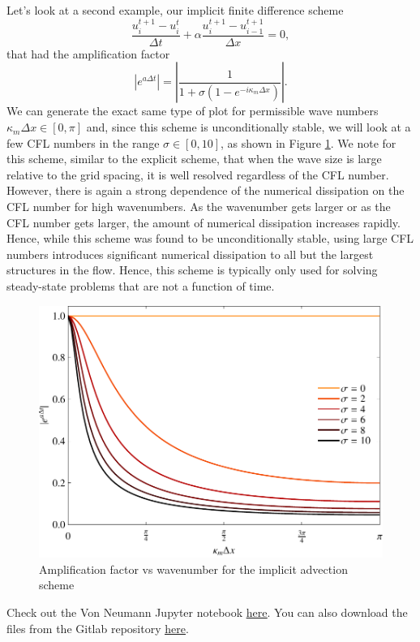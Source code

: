 Let's look at a second example, our implicit finite difference scheme
\begin{equation}
	\frac{u_i^{t+1} - u_{i}^t}{\Delta t} +  \alpha \frac{u_i^{t+1} - u_{i-1}^{t+1}}{\Delta x} = 0,
\end{equation}
that had the amplification factor
\begin{equation}
	|e^{a\Delta t}| = \left| \frac{1}{1 + \sigma \left( 1 - e^{-i \kappa_m \Delta x} \right)} \right|.
\end{equation}
We can generate the exact same type of plot for permissible wave numbers $\kappa_m \Delta x \in [0,\pi]$ and, since this scheme is unconditionally stable, we will look at a few CFL numbers in the range $\sigma \in [0,10]$, as shown in Figure \ref{fig:dissipation_advection_implicit}. We note for this scheme, similar to the explicit scheme, that when the wave size is large relative to the grid spacing, it is well resolved regardless of the CFL number. However, there is again a strong dependence of the numerical dissipation on the CFL number for high wavenumbers. As the wavenumber gets larger or as the CFL number gets larger, the amount of numerical dissipation increases rapidly. Hence, while this scheme was found to be unconditionally stable, using large CFL numbers introduces significant numerical dissipation to all but the largest structures in the flow. Hence, this scheme is typically only used for solving steady-state problems that are not a function of time.
\begin{figure}[htbp]
	\centering
	\includegraphics[width=0.6\linewidth]{Pictures/dissipation_adv_implct}
	\caption{Amplification factor vs wavenumber for the implicit advection scheme}
	\label{fig:dissipation_advection_implicit}
\end{figure}
\begin{jupyternote}
	Check out the Von Neumann Jupyter notebook \href{\binderurl}{\underline{here}}. You can also download the files from the Gitlab repository \href{\repourl}{\underline{here}}.
\end{jupyternote}
